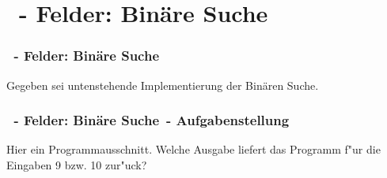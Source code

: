 \def\stitle{\theexercise\ - Felder: Binäre Suche}
\section{\stitle}

\begin{frame}[t]%
    \frametitle{\stitle}
\medskip
Gegeben sei untenstehende Implementierung der Binären Suche.

\end{frame}


\begin{frame}
 \frametitle{\stitle \, - Aufgabenstellung}%
\medskip

Hier ein Programmausschnitt.
Welche Ausgabe liefert das Programm f"ur die Eingaben 9 bzw. 10 zur"uck?

\end{frame}
